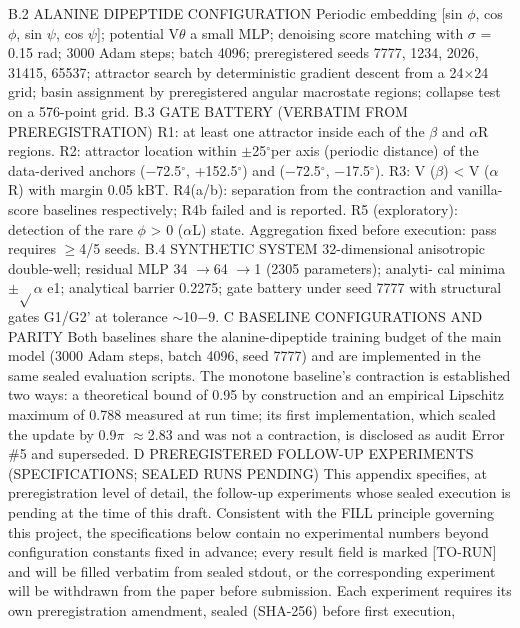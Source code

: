 \documentclass{article}
\begin{document}

B.2
ALANINE DIPEPTIDE CONFIGURATION
Periodic embedding [sin $\phi$, cos $\phi$, sin $\psi$, cos $\psi$];
potential V$\theta$ a small MLP; denoising score
matching
with
$\sigma$
=
0.15 rad;
3000
Adam
steps;
batch
4096;
preregistered
seeds
{7777, 1234, 2026, 31415, 65537}; attractor search by deterministic gradient descent from a 24$\times$24
grid; basin assignment by preregistered angular macrostate regions; collapse test on a 576-point grid.
B.3
GATE BATTERY (VERBATIM FROM PREREGISTRATION)
R1: at least one attractor inside each of the $\beta$ and $\alpha$R regions. R2: attractor location within $\pm$25$^\circ$per
axis (periodic distance) of the data-derived anchors ($-$72.5$^\circ$, +152.5$^\circ$) and ($-$72.5$^\circ$, $-$17.5$^\circ$). R3:
V ($\beta$) < V ($\alpha$R) with margin 0.05 kBT. R4(a/b): separation from the contraction and vanilla-score
baselines respectively; R4b failed and is reported. R5 (exploratory): detection of the rare $\phi$ > 0
($\alpha$L) state. Aggregation fixed before execution: pass requires $\ge$4/5 seeds.
B.4
SYNTHETIC SYSTEM
32-dimensional anisotropic double-well; residual MLP 34 $\to$64 $\to$1 (2305 parameters); analyti-
cal minima $\pm$$\sqrt{}$$\alpha$ e1; analytical barrier 0.2275; gate battery under seed 7777 with structural gates
G1/G2' at tolerance $\sim$10$-$9.
C
BASELINE CONFIGURATIONS AND PARITY
Both baselines share the alanine-dipeptide training budget of the main model (3000 Adam steps,
batch 4096, seed 7777) and are implemented in the same sealed evaluation scripts. The monotone
baseline's contraction is established two ways: a theoretical bound of 0.95 by construction and an
empirical Lipschitz maximum of 0.788 measured at run time; its first implementation, which scaled
the update by 0.9$\pi$ $\approx$2.83 and was not a contraction, is disclosed as audit Error \#5 and superseded.
D
PREREGISTERED FOLLOW-UP EXPERIMENTS (SPECIFICATIONS; SEALED
RUNS PENDING)
This appendix specifies, at preregistration level of detail, the follow-up experiments whose sealed
execution is pending at the time of this draft. Consistent with the FILL principle governing this
project, the specifications below contain no experimental numbers beyond configuration constants
fixed in advance; every result field is marked [TO-RUN] and will be filled verbatim from sealed
stdout, or the corresponding experiment will be withdrawn from the paper before submission. Each
experiment requires its own preregistration amendment, sealed (SHA-256) before first execution,
\end{document}
